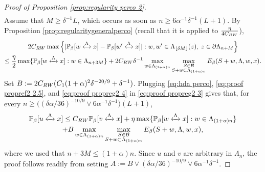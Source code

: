 \documentclass[10pt,a4paper]{amsart}
\newcommand{\connect}{\xleftrightarrow}
\begin{document}
\begin{proof}[Proof of Proposition \textup{\ref{prop:regularity perco 2}}]
\begin{multline}
\end{multline}
Assume that $M\geq \delta^{-1}L$, which occurs as soon as $n\geq 6\alpha^{-1}\delta^{-1}(L+1)$. By Proposition \ref{prop:regularitygeneralperco} (recall that it is applied to $\tfrac{\eta}{4C_{\rm RW}}$),
\begin{multline}\label{eq:proof propreg2 4}
	2C_{\rm RW}\max \Big\{|\mathbb P_\beta[w\connect{\Lambda\:}x]-\mathbb P_\beta[w'\connect{\Lambda\:}x]|: w,w'\in \Lambda_{\lfloor \delta M\rfloor}(z), \: z\in \partial \Lambda_{n+M}\Big\}\\\leq \frac{\eta}{2}\max\{\mathbb P_\beta[w\connect{\Lambda\:}x]: w \in \Lambda_{n+3M}\}+2C_{\rm RW}\delta^{-1}\max_{w\in \Lambda_{(1+\alpha)n}}\max_{\substack{S\in \mathcal B\\S+w\subset \Lambda_{(1+\alpha)n}}}{E}_\beta(S+w, \Lambda,w,x).
\end{multline}
Set $B:=2C_{\rm RW}(C_1(1+\alpha)^2\delta^{-20/9}+\delta^{-1})$. 
Plugging \eqref{eq:hda perco}, \eqref{eq:proof propref2 2.5}, and \eqref{eq:proof propreg2 4} in \eqref{eq:proof propreg2 3} gives that, for every $n\geq \Big((\delta\alpha/36)^{-10/9}\vee 6\alpha^{-1}\delta^{-1}\Big)(L+1)$,
\begin{multline}
	\mathbb P_\beta[u\connect{\Lambda\:}x]\leq C_{\rm RW}\mathbb P_\beta[v\connect{\Lambda\:}x]+\eta\max\{\mathbb P_\beta[w\connect{\Lambda\:}x]:w\in \Lambda_{(1+\alpha)n}\}
	\\+B\max_{w\in \Lambda_{(1+\alpha)n}}\max_{\substack{S\in \mathcal B\\S+w\subset \Lambda_{(1+\alpha)n}}}{E}_\beta(S+w, \Lambda,w,x),
\end{multline}
where we used that $n+3M\leq (1+\alpha)n$. Since $u$ and $v$ are arbitrary in $\Lambda_n$, the proof follows readily from setting $A:=B\vee (\delta\alpha/36)^{-10/9}\vee 6\alpha^{-1}\delta^{-1}$.
 \end{proof}
\end{document}
